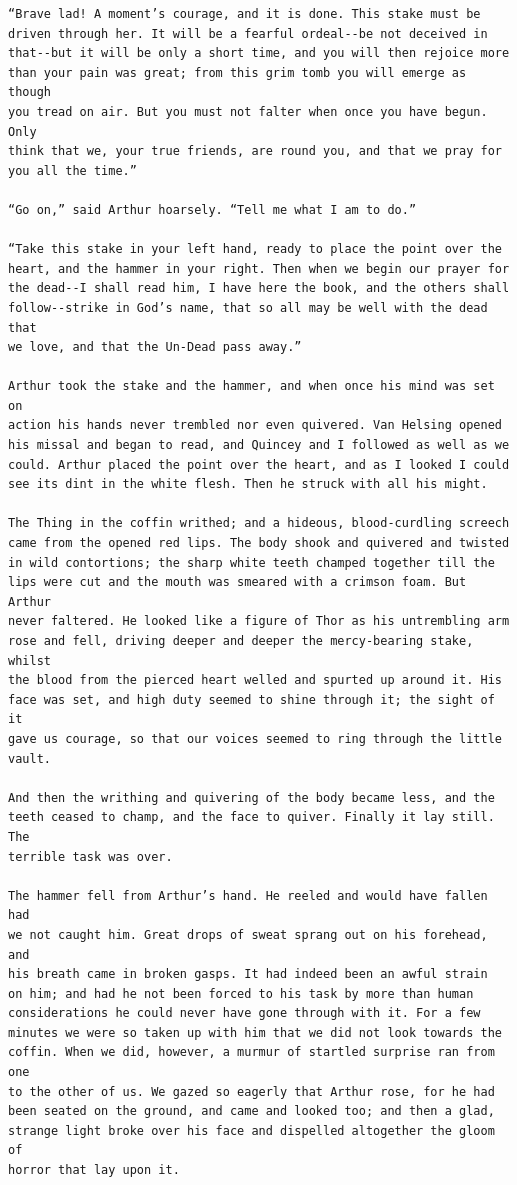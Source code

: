 \documentclass{article}
\begin{document}
\begin{verbatim}
“Brave lad! A moment’s courage, and it is done. This stake must be
driven through her. It will be a fearful ordeal--be not deceived in
that--but it will be only a short time, and you will then rejoice more
than your pain was great; from this grim tomb you will emerge as though
you tread on air. But you must not falter when once you have begun. Only
think that we, your true friends, are round you, and that we pray for
you all the time.”

“Go on,” said Arthur hoarsely. “Tell me what I am to do.”

“Take this stake in your left hand, ready to place the point over the
heart, and the hammer in your right. Then when we begin our prayer for
the dead--I shall read him, I have here the book, and the others shall
follow--strike in God’s name, that so all may be well with the dead that
we love, and that the Un-Dead pass away.”

Arthur took the stake and the hammer, and when once his mind was set on
action his hands never trembled nor even quivered. Van Helsing opened
his missal and began to read, and Quincey and I followed as well as we
could. Arthur placed the point over the heart, and as I looked I could
see its dint in the white flesh. Then he struck with all his might.

The Thing in the coffin writhed; and a hideous, blood-curdling screech
came from the opened red lips. The body shook and quivered and twisted
in wild contortions; the sharp white teeth champed together till the
lips were cut and the mouth was smeared with a crimson foam. But Arthur
never faltered. He looked like a figure of Thor as his untrembling arm
rose and fell, driving deeper and deeper the mercy-bearing stake, whilst
the blood from the pierced heart welled and spurted up around it. His
face was set, and high duty seemed to shine through it; the sight of it
gave us courage, so that our voices seemed to ring through the little
vault.

And then the writhing and quivering of the body became less, and the
teeth ceased to champ, and the face to quiver. Finally it lay still. The
terrible task was over.

The hammer fell from Arthur’s hand. He reeled and would have fallen had
we not caught him. Great drops of sweat sprang out on his forehead, and
his breath came in broken gasps. It had indeed been an awful strain
on him; and had he not been forced to his task by more than human
considerations he could never have gone through with it. For a few
minutes we were so taken up with him that we did not look towards the
coffin. When we did, however, a murmur of startled surprise ran from one
to the other of us. We gazed so eagerly that Arthur rose, for he had
been seated on the ground, and came and looked too; and then a glad,
strange light broke over his face and dispelled altogether the gloom of
horror that lay upon it.


\end{verbatim}
\end{document}

